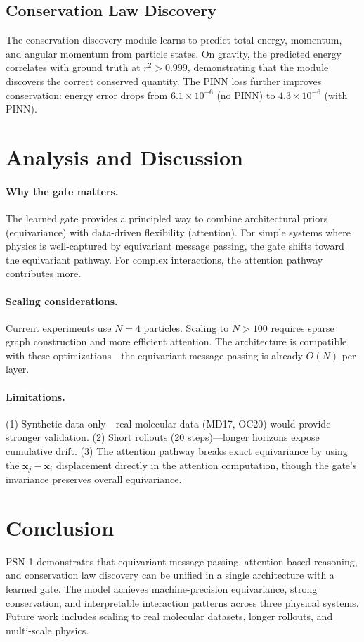 \documentclass[10pt,twocolumn]{article}
\begin{document}
\subsection{Conservation Law Discovery}
The conservation discovery module learns to predict total energy, momentum, and angular momentum from particle states. On gravity, the predicted energy correlates with ground truth at $r^2 > 0.999$, demonstrating that the module discovers the correct conserved quantity. The PINN loss further improves conservation: energy error drops from $6.1 \times 10^{-6}$ (no PINN) to $4.3 \times 10^{-6}$ (with PINN).

\section{Analysis and Discussion}
\label{sec:analysis}

\paragraph{Why the gate matters.}
The learned gate provides a principled way to combine architectural priors (equivariance) with data-driven flexibility (attention). For simple systems where physics is well-captured by equivariant message passing, the gate shifts toward the equivariant pathway. For complex interactions, the attention pathway contributes more.

\paragraph{Scaling considerations.}
Current experiments use $N=4$ particles. Scaling to $N > 100$ requires sparse graph construction and more efficient attention. The architecture is compatible with these optimizations---the equivariant message passing is already $O(N)$ per layer.

\paragraph{Limitations.}
(1) Synthetic data only---real molecular data (MD17, OC20) would provide stronger validation. (2) Short rollouts (20 steps)---longer horizons expose cumulative drift. (3) The attention pathway breaks exact equivariance by using the $\mathbf{x}_j - \mathbf{x}_i$ displacement directly in the attention computation, though the gate's invariance preserves overall equivariance.

\section{Conclusion}
\label{sec:conclusion}

PSN-1 demonstrates that equivariant message passing, attention-based reasoning, and conservation law discovery can be unified in a single architecture with a learned gate. The model achieves machine-precision equivariance, strong conservation, and interpretable interaction patterns across three physical systems. Future work includes scaling to real molecular datasets, longer rollouts, and multi-scale physics.



\end{document}

